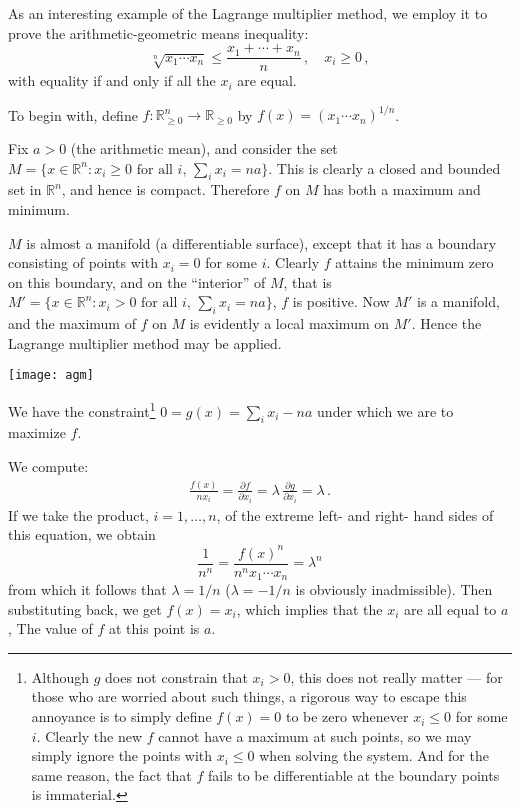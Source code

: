 \documentclass[12pt]{article}
\newcommand{\real}{\mathbb{R}}
\begin{document}
As an interesting example of the Lagrange multiplier method,
we employ it to prove the arithmetic-geometric means inequality:
\[
\sqrt[n]{x_1 \dotsm x_n} \leq \frac{x_1 + \dotsb + x_n}{n}\,, \quad x_i \geq 0\,,
\]
with equality if and only if all the $x_i$ are equal.

To begin with, define $f\colon \real_{\geq 0}^n \to \real_{\geq 0}$ by $f(x) = (x_1 \dotsm x_n)^{1/n}$.

Fix $a > 0$ (the arithmetic mean),
and consider the set $M = \{ x \in \real^n : x_i \geq 0 \text{ for all $i$, } \sum_i x_i = na \}$.
This is clearly a closed and bounded set in $\real^n$, and hence is compact.
Therefore $f$ on $M$ has both a maximum and minimum.

$M$ is almost a manifold (a differentiable surface), except that it has a boundary consisting
of points with $x_i = 0$ for some $i$.
Clearly $f$ attains the minimum zero on this boundary,
and on the ``interior'' of $M$,
that is $M' = \{ x \in \real^n : x_i > 0 \text{ for all $i$, } \sum_i x_i = na \}$,
$f$ is positive. Now $M'$ is a manifold, and the maximum of $f$ on $M$
is evidently a local maximum on $M'$.  Hence
the Lagrange multiplier method may be applied.

\begin{center}
\texttt{[image: agm]}
\end{center}

We have the constraint\footnote{Although $g$ does not constrain that $x_i > 0$,
this does not really matter --- for those who are worried about such
things, a rigorous way to escape this annoyance is to simply
define $f(x) = 0$ to be zero whenever $x_i \leq 0$ for some $i$.
Clearly the new $f$ cannot have a maximum at such points,
so we may simply ignore the points with $x_i \leq 0$ when solving the system.
And for the same reason, the fact that $f$ fails to be differentiable at the boundary
points is immaterial.} $0 = g(x) = \sum_i x_i - na$
under which we are to maximize $f$.

We compute:
\begin{align*}
\frac{f(x)}{nx_i} = \frac{\partial f}{ \partial x_i} = \lambda \, \frac{\partial g}{\partial x_i} = \lambda\,.
\end{align*}
If we take the product, $i = 1, \dotsc, n$, of the extreme left- and right- hand sides of this equation,
we obtain
\[
\frac{1}{n^n} = \frac{f(x)^n}{n^n x_1 \dotsm x_n} = \lambda^n
\]
from which it follows that $\lambda = 1/n$ ($\lambda = -1/n$ is obviously inadmissible).
Then substituting back, we get $f(x) = x_i$, which implies that the $x_i$ are all equal to $a$,
The value of $f$ at this point is $a$.
\end{document}
